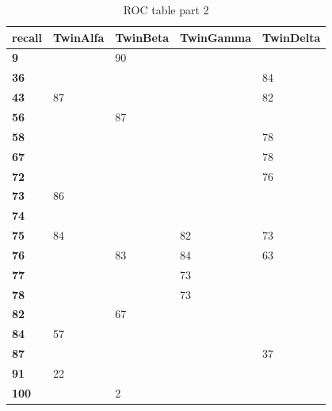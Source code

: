 \begin{appendices}
\begin{landscape}
\begin{table}[!ht]
\centering
\caption{ROC table part 2}
\label{ROCTable2}
\begin{tabular}{|l|l|l|l|l|}
\hline
\textbf{recall} & \textbf{TwinAlfa} & \textbf{TwinBeta} & \textbf{TwinGamma} & \textbf{TwinDelta} \\ \hline
\textbf{9}      &                   & 90                &                    &                    \\ \hline
\textbf{36}     &                   &                   &                    & 84                 \\ \hline
\textbf{43}     & 87                &                   &                    & 82                 \\ \hline
\textbf{56}     &                   & 87                &                    &                    \\ \hline
\textbf{58}     &                   &                   &                    & 78                 \\ \hline
\textbf{67}     &                   &                   &                    & 78                 \\ \hline
\textbf{72}     &                   &                   &                    & 76                 \\ \hline
\textbf{73}     & 86                &                   &                    &                    \\ \hline
\textbf{74}     &                   &                   &                    &                    \\ \hline
\textbf{75}     & 84                &                   & 82                 & 73                 \\ \hline
\textbf{76}     &                   & 83                & 84                 & 63                 \\ \hline
\textbf{77}     &                   &                   & 73                 &                    \\ \hline
\textbf{78}     &                   &                   & 73                 &                    \\ \hline
\textbf{82}     &                   & 67                &                    &                    \\ \hline
\textbf{84}     & 57                &                   &                    &                    \\ \hline
\textbf{87}     &                   &                   &                    & 37                 \\ \hline
\textbf{91}     & 22                &                   &                    &                    \\ \hline
\textbf{100}    &                   & 2                 &                    &                    \\ \hline
\end{tabular}
\end{table}
\end{landscape}
\clearpage


\end{appendices}
